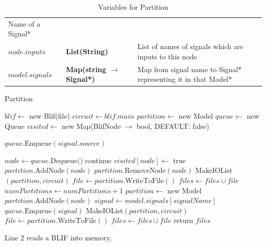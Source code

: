 \documentclass[12pt,final,oneside]{dwThesis} %
\begin{document}
\begin{table}
\begin{center}
\begin{tabularx}{\linewidth}{llX}
            Name of a Signal*\\ $node.inputs$ &\textbf{  List(String) } &  List
            of names of signals which are inputs to this node\\ $model.signals$
            &\textbf{  Map(string $\to$ Signal*) } &  Map from signal name to
            Signal* representing it in that Model*\\ \bottomrule \end{tabularx}
         \caption{Variables for Partition} \label{varPart} \end{center}
   \end{table} \begin{algorithm} \caption{Partition}\label{partition}
      \begin{algorithmic}[1]  \State $blif \gets$
         new Blif(file)  \State $circuit \gets
         blif.main$  \State
         $partition \gets$ new Model  \State $queue
         \gets$ new Queue  \State $visited \gets$ new
         Map(BlifNode $\to$ bool, DEFAULT: false)

          \State
         $queue.\mbox{Enqueue}(signal.source)$ \EndFor

          \State $node \gets queue.\mbox{Dequeue()}$
          \State continue  \EndIf \State $visited[node] \gets $ true
         \State $partition.\mbox{AddNode}(node)$
          \State
         $partition.\mbox{RemoveNode}(node)$ \State MakeIOList$(partition,
         circuit)$ \State $file \gets partition.\mbox{WriteToFile}()$ \State
         $files \gets files\cup file$ \State $numPartitions \gets
         numPartitions+1$ \State $partition \gets$ new Model  \State $partition.\mbox{AddNode}(node)$ \EndIf
          \State $signal \gets
         model.signals[signalName]$ \State $queue.\mbox{Enqueue}(signal)$
         \EndFor \EndWhile {} \State
         MakeIOList$(partition, circuit)$ \State $file \gets
         partition.\mbox{WriteToFile}()$ \State $files \gets files\cup file$
         \EndIf \State return $files$ \EndProcedure \end{algorithmic}
   \end{algorithm} \FloatBarrier Line 2 reads a \gls{BLIF} into memory,
\end{document}
